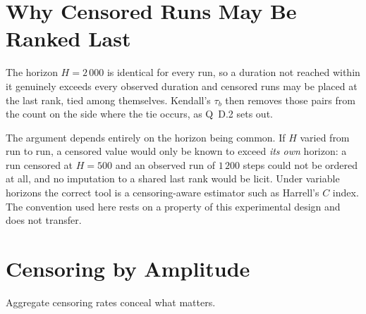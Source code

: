 \documentclass[11pt,a4paper]{article}
\begin{document}
\section{Why Censored Runs May Be Ranked Last}

The horizon $H = 2\,000$ is identical for every run, so a duration not reached within it
genuinely exceeds every observed duration and censored runs may be placed at the last rank,
tied among themselves. Kendall's $\tau_b$ then removes those pairs from the count on the
side where the tie occurs, as Q~D.2 sets out.

The argument depends entirely on the horizon being common. If $H$ varied from run to run, a
censored value would only be known to exceed \emph{its own} horizon: a run censored at
$H = 500$ and an observed run of $1\,200$ steps could not be ordered at all, and no
imputation to a shared last rank would be licit. Under variable horizons the correct tool
is a censoring-aware estimator such as Harrell's $C$ index. The convention used here rests
on a property of this experimental design and does not transfer.

\section{Censoring by Amplitude}

Aggregate censoring rates conceal what matters.
\end{document}
